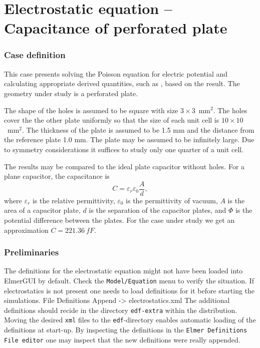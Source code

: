 \chapter{Electrostatic equation -- Capacitance of perforated plate}



\subsection*{Case definition}

This case presents solving the Poisson equation for electric potential
and calculating appropriate derived quantities, such as
, based on the result. 
The geometry under study is a perforated plate.

The shape of the holes is assumed to be square with size $3\times 3$~mm$^2$.
The holes cover the the other plate uniformly so that the size of each unit cell is 
$10\times 10$~mm$^2$.
The thickness of the plate is assumed to be 
1.5 mm and the distance from the reference plate 1.0 mm. 
The plate may be assumed to be infinitely large. Due to symmetry considerations it suffices to study
only one quarter of a unit cell.

The results may be compared to the ideal plate capacitor without holes. 
For a plane capacitor, the
capacitance is
\begin{equation}
C=\varepsilon_r\varepsilon_0\frac{A}{d},
\end{equation}
where $\varepsilon_r$ is the relative permittivity, $\varepsilon_0$
is the permittivity of vacuum, $A$ is the area of a capacitor plate,
$d$ is the separation of the capacitor plates, and $\Phi$ is the
potential difference between the plates.
For the case under study we get an approximation $C=221.36~fF$.


\subsection*{Preliminaries}

The definitions for the electrostatic equation might not have been loaded into ElmerGUI by default. Check the 
\texttt{Model/Equation} menu
to verify the situation. If electrostatics is not present  
one needs to load definitions for it before starting the simulations.
\ttbegin
File 
  Definitions
    Append -> electrostatics.xml
\ttend
The additional definitions should recide in the directory \texttt{edf-extra} within the distribution.
Moving the desired \texttt{xml} files to the \texttt{edf}-directory enables automatic loading of the 
definitions at start-up. By inspecting the definitions in the \texttt{Elmer Definitions File editor} one
may inspect that the new definitions were really appended. 


